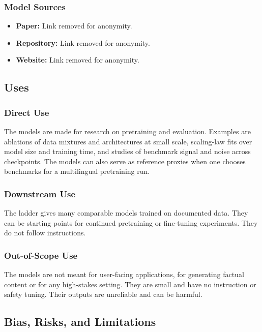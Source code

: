 \subsubsection*{Model Sources}

\begin{itemize}[itemsep=1pt,topsep=2pt]
    \item \textbf{Paper:} Link removed for anonymity.
    \item \textbf{Repository:} Link removed for anonymity.
    \item \textbf{Website:} Link removed for anonymity.
\end{itemize}

\subsection*{Uses}

\subsubsection*{Direct Use}

The models are made for research on pretraining and evaluation. Examples are ablations of data mixtures and architectures at small scale, scaling-law fits over model size and training time, and studies of benchmark signal and noise across checkpoints. The models can also serve as reference proxies when one chooses benchmarks for a multilingual pretraining run.

\subsubsection*{Downstream Use}

The ladder gives many comparable models trained on documented data. They can be starting points for continued pretraining or fine-tuning experiments. They do not follow instructions.

\subsubsection*{Out-of-Scope Use}

The models are not meant for user-facing applications, for generating factual content or for any high-stakes setting. They are small and have no instruction or safety tuning. Their outputs are unreliable and can be harmful.

\subsection*{Bias, Risks, and Limitations}

